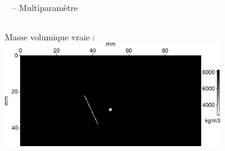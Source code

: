 \documentclass[10pt,xcolor=x11names,compress, notes=show]{beamer}%
\begin{document}
\begin{frame}{\insertsectionhead~ -- Multiparamètre}
\begin{small}
\begin{columns}
		Masse volumique vraie : \\[0.2cm]
		\includegraphics[width=0.7\textwidth]{img/rho_true.png}
	\end{columns}	
	
\end{small}
\end{frame}

\subsection*{}
\end{document}
